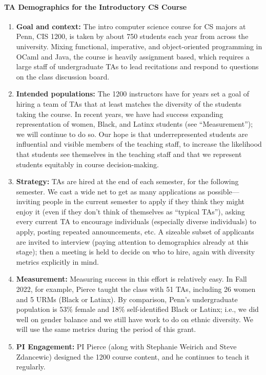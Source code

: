 \paragraph*{TA Demographics for the Introductory CS Course}

\begin{enumerate}
\item {\bf Goal and context:} The intro computer science course for CS
majors at Penn, CIS 1200, is taken by about 750 students each year
from across the university.  Mixing functional, imperative, and
object-oriented programming in OCaml and Java, the course is heavily
assignment based, which requires a large staff of undergraduate TAs to
lead recitations and respond to questions on the class discussion
board.

\item {\bf Intended populations:} The 1200 instructors have for years
set a goal of hiring a team of TAs that at least matches the diversity of the
students taking the course. In recent years, we have had success expanding
representation of women, Black, and Latinx students (see ``Measurement''); we
will continue to do so. Our hope is that underrepresented students are
influential and visible members of the teaching staff, to increase the
likelihood that students see themselves in the teaching staff and that we
represent students equitably in course decision-making.  

\item {\bf Strategy:} TAs are hired at the end of each semester, for
the following semester.  We cast a wide net to get as many
applications as possible---inviting people in the current semester to
apply if they think they might enjoy it (even if they don't think of
themselves as ``typical TAs''), asking every current TA to encourage
individuals (especially diverse individuals) to apply, posting
repeated announcements, etc.  A sizeable subset of applicants are
invited to interview (paying attention to demographics already at this
stage); then a meeting is held to decide on who to hire, again with
diversity metrics explicitly in mind.

\item {\bf Measurement:} Measuring success in this effort is
relatively easy.  In Fall 2022, for example, Pierce taught the class
with 51 TAs, including 26 women and 5 URMs (Black or Latinx).  By
comparison, Penn's undergraduate population is 53\% female and 18\%
self-identified Black or Latinx; i.e., we did well on gender balance
and we still have work to do on ethnic diversity.  We will use the
same metrics during the period of this grant.

\item {\bf PI Engagement:} PI Pierce (along with Stephanie Weirich and
Steve Zdancewic) designed the 1200 course content, and he continues to
teach it regularly.
\end{enumerate}


